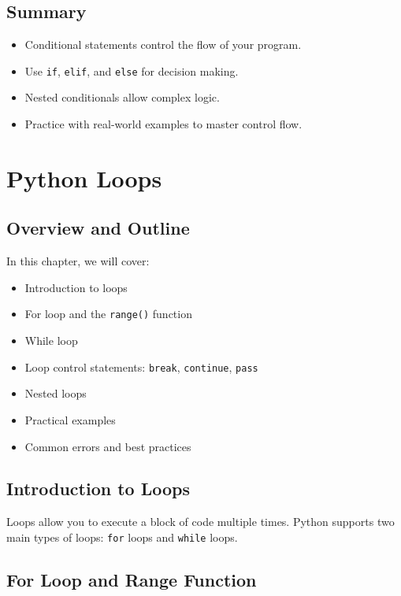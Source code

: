 \section{Summary}

\begin{itemize}
    \item Conditional statements control the flow of your program.
    \item Use \texttt{if}, \texttt{elif}, and \texttt{else} for decision making.
    \item Nested conditionals allow complex logic.
    \item Practice with real-world examples to master control flow.
\end{itemize}

\chapter{Python Loops}

\section{Overview and Outline}

In this chapter, we will cover:
\begin{itemize}
    \item Introduction to loops
    \item For loop and the \texttt{range()} function
    \item While loop
    \item Loop control statements: \texttt{break}, \texttt{continue}, \texttt{pass}
    \item Nested loops
    \item Practical examples
    \item Common errors and best practices
\end{itemize}

\section{Introduction to Loops}

Loops allow you to execute a block of code multiple times.  
Python supports two main types of loops: \texttt{for} loops and \texttt{while} loops.

\section{For Loop and Range Function}

